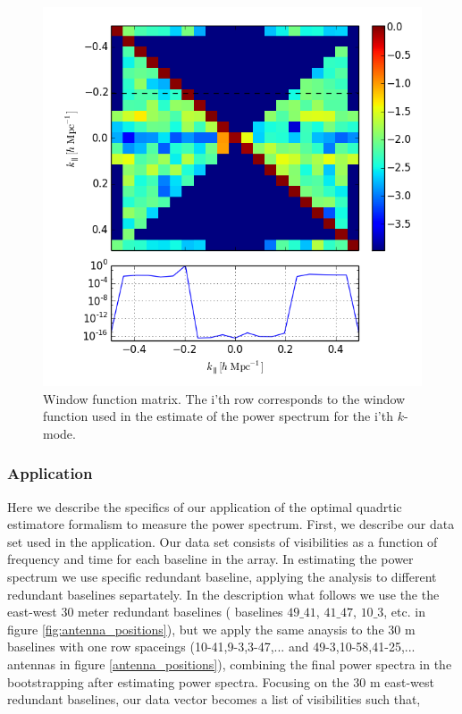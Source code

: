 \documentclass[twocolumn,numberedappendix]{emulateapj} \shorttitle{PSA64}
\begin{document}
\begin{figure}[t!]\centering
\includegraphics[width=\columnwidth, height=\columnwidth]{plots/window.png}
\caption{Window function matrix. The i'th row corresponds to the window function
used in the estimate of the power spectrum for the i'th $k$-mode.}
\label{fig:window_func}
\end{figure}


\subsubsection{Application}

Here we describe the specifics of our application of the optimal quadrtic
estimatore formalism to measure the power spectrum. First, we describe our data
set used in the application. Our data set consists of visibilities as a function
of frequency and time for each baseline in the array. In estimating the power
spectrum we use specific redundant baseline, applying the analysis to
different redundant baselines separtately. In the description what follows we
use the the east-west 30 meter redundant baselines ( baselines $49\_41$,
$41\_47$, $10\_3$, etc. in figure \ref{fig:antenna_positions}), but we apply the
same anaysis to the 30 m baselines with one row spaceings (10-41,9-3,3-47,...
and 49-3,10-58,41-25,... antennas in figure \ref{antenna_positions}), combining
the final power spectra in the bootstrapping after estimating power spectra.
Focusing on the 30 m east-west redundant baselines, our data vector becomes a
list of visibilities such that, 
\end{document}
